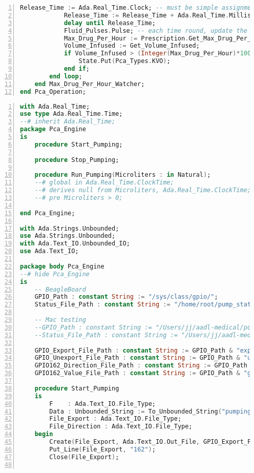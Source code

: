 \begin{lstlisting}[language=ada, gobble=0, numbers=left, caption={\lstinline{Pca_Operation} package}, label={listing:pca_ravenscar:pca_operation}]
            Release_Time := Ada.Real_Time.Clock; -- must be simple assignment
            Release_Time := Release_Time + Ada.Real_Time.Milliseconds(Period);
            delay until Release_Time;
            Fluid_Pulses.Pulse; -- each time round, update the volume infused moving window
            Max_Drug_Per_Hour := Prescription.Get_Max_Drug_Per_Hour;
            Volume_Infused := Get_Volume_Infused;
            if Volume_Infused > (Integer(Max_Drug_Per_Hour)*1000) then -- convert to microliters
                State.Put(Pca_Types.KVO);
            end if;
        end loop;
    end Max_Drug_Per_Hour_Watcher;
end Pca_Operation;
\end{lstlisting} 
\doublespacing


\singlespacing
\begin{lstlisting}[language=ada, gobble=0, numbers=left, caption={\lstinline{Pca_Engine} package}, label={listing:pca_ravenscar:pca_engine}]
with Ada.Real_Time;
use type Ada.Real_Time.Time;
--# inherit Ada.Real_Time;
package Pca_Engine
is
    procedure Start_Pumping;

    procedure Stop_Pumping;

    procedure Run_Pumping(Microliters : in Natural);
    --# global in Ada.Real_Time.ClockTime;
    --# derives null from Microliters, Ada.Real_Time.ClockTime;
    --# pre Microliters > 0;

end Pca_Engine;

with Ada.Strings.Unbounded;
use Ada.Strings.Unbounded;
with Ada.Text_IO.Unbounded_IO;
use Ada.Text_IO;

package body Pca_Engine
--# hide Pca_Engine
is
    -- BeagleBoard
    GPIO_Path : constant String := "/sys/class/gpio/";
    Status_File_Path : constant String := "/home/root/pump_status.txt";

    -- Mac testing
    --GPIO_Path : constant String := "/Users/jj/aadl-medical/pca-pump-beagleboard/pca_ravenscar/files/";
    --Status_File_Path : constant String := "/Users/jj/aadl-medical/pca-pump-beagleboard/pca_ravenscar/files/pump_status.txt";

    GPIO_Export_File_Path : constant String := GPIO_Path & "export";
    GPIO_Unexport_File_Path : constant String := GPIO_Path & "unexport";
    GPIO162_Direction_File_Path : constant String := GPIO_Path & "gpio162/direction";
    GPIO162_Value_File_Path : constant String := GPIO_Path & "gpio162/value";

    procedure Start_Pumping
    is
        F    : Ada.Text_IO.File_Type;
        Data : Unbounded_String := To_Unbounded_String("pumping");
        File_Export : Ada.Text_IO.File_Type;
        File_Direction : Ada.Text_IO.File_Type;
    begin
        Create(File_Export, Ada.Text_IO.Out_File, GPIO_Export_File_Path);
        Put_Line(File_Export, "162");
        Close(File_Export);


\end{lstlisting}
